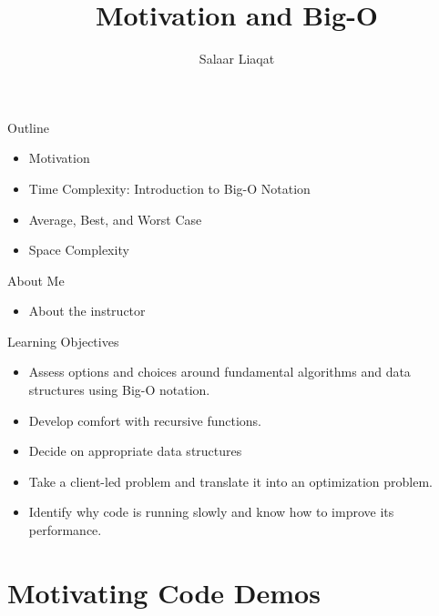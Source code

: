 \documentclass[
  ignorenonframetext,
]{beamer}
\title{Motivation and Big-O}
\author{Salaar Liaqat}
\date{}
\institute{Data Sciences Institute, UofT}
\providecommand{\tightlist}{%
  \setlength{\itemsep}{0pt}\setlength{\parskip}{0pt}}\usepackage{longtable,booktabs,array}
\begin{document}
\frame{\titlepage}
\ifdefined\Shaded\renewenvironment{Shaded}{\begin{tcolorbox}[frame hidden, borderline west={3pt}{0pt}{shadecolor}, enhanced, sharp corners, boxrule=0pt, breakable, interior hidden]}{\end{tcolorbox}}\fi

\begin{frame}{Outline}
\protect\hypertarget{outline}{}
\begin{itemize}
\item
  Motivation
\item
  Time Complexity: Introduction to Big-O Notation
\item
  Average, Best, and Worst Case
\item
  Space Complexity
\end{itemize}
\end{frame}

\begin{frame}{About Me}
\protect\hypertarget{about-me}{}
\begin{itemize}
\tightlist
\item
  About the instructor
\end{itemize}
\end{frame}

\begin{frame}{Learning Objectives}
\protect\hypertarget{learning-objectives}{}
\begin{itemize}
\item
  Assess options and choices around fundamental algorithms and data
  structures using Big-O notation.
\item
  Develop comfort with recursive functions.
\item
  Decide on appropriate data structures
\item
  Take a client-led problem and translate it into an optimization
  problem.
\item
  Identify why code is running slowly and know how to improve its
  performance.
\end{itemize}
\end{frame}

\hypertarget{motivating-code-demos}{%
\section{Motivating Code Demos}\label{motivating-code-demos}}
\end{document}
